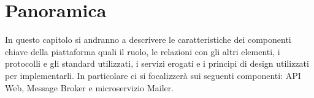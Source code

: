\section{Panoramica}
In questo capitolo si andranno a descrivere le caratteristiche dei componenti chiave della piattaforma quali il ruolo, le relazioni con gli altri elementi,
i protocolli e gli standard utilizzati, i servizi erogati e i principi di design utilizzati per implementarli.
In particolare ci si focalizzerà sui seguenti componenti: API Web, Message Broker e microservizio Mailer.

